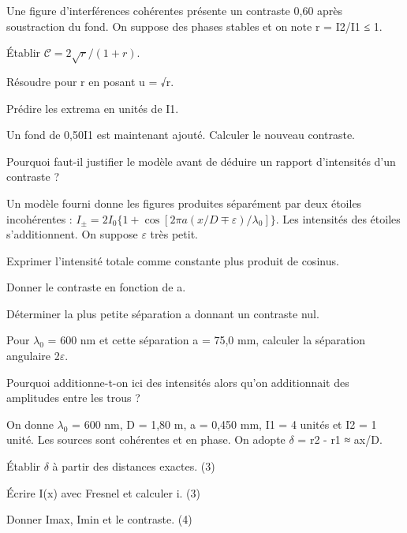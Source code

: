 \label{ex-D2}
Une figure d’interférences cohérentes présente un contraste 0,60 après soustraction du fond. On suppose des phases stables et on note r = I2/I1 ≤ 1.\begin{questions}
\item Établir $\mathcal C=2\sqrt r/(1+r)$.
\item Résoudre pour r en posant u = √r.
\item Prédire les extrema en unités de I1.
\item Un fond de 0,50I1 est maintenant ajouté. Calculer le nouveau contraste.
\item Pourquoi faut-il justifier le modèle avant de déduire un rapport d’intensités d’un contraste ?
\end{questions}


\label{ex-D3}
Un modèle fourni donne les figures produites séparément par deux étoiles incohérentes : $I_\pm=2I_0\{1+\cos[2\pi a(x/D\mp\varepsilon)/\lambda_0]\}$. Les intensités des étoiles s’additionnent. On suppose \ensuremath{\varepsilon} très petit.\begin{questions}
\item Exprimer l’intensité totale comme constante plus produit de cosinus.
\item Donner le contraste en fonction de a.
\item Déterminer la plus petite séparation a donnant un contraste nul.
\item Pour \ensuremath{\lambda_0} = 600 nm et cette séparation a = 75,0 mm, calculer la séparation angulaire 2\ensuremath{\varepsilon}.
\item Pourquoi additionne-t-on ici des intensités alors qu’on additionnait des amplitudes entre les trous ?
\end{questions}


On donne \ensuremath{\lambda_0} = 600 nm, D = 1,80 m, a = 0,450 mm, I1 = 4 unités et I2 = 1 unité. Les sources sont cohérentes et en phase. On adopte \ensuremath{\delta} = r2 - r1 ≈ ax/D.
\begin{questions}
\item Établir \ensuremath{\delta} à partir des distances exactes. (3)
\item Écrire I(x) avec Fresnel et calculer i. (3)
\item Donner Imax, Imin et le contraste. (4)
\end{questions}

